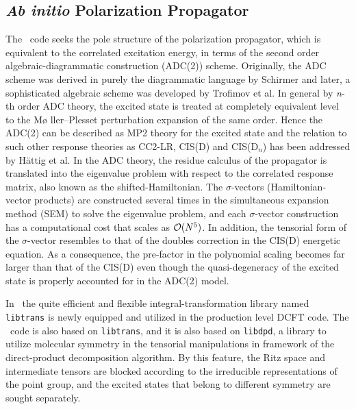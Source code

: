 \subsection{\textit{Ab initio} Polarization Propagator} \label{sec:adc}
\renewcommand{\optionname}[2]{\texttt{\nameref{op-#2-#1}}}

The \PSIadc\ code seeks the pole structure of the polarization
propagator, which is equivalent to the correlated excitation energy,
in terms of the second order algebraic-diagrammatic construction
(ADC(2)) scheme.  Originally, the ADC scheme was derived in purely
the diagrammatic language by Schirmer \cite{Schirmer:1982} and later,
a sophisticated algebraic scheme was developed \cite{Trofimov:2006}
by Trofimov et al. In general by \textit{n}-th order ADC theory, the
excited state is treated at completely equivalent level to the M\o
ller--Plesset perturbation expansion of the same order. Hence the ADC(2)
can be described as MP2 theory for the excited state and the relation
to such other response theories as CC2-LR, CIS(D) and CIS(D${}_n$) has
been addressed \cite{Haettig:2002} by H\"attig et al.  In the ADC theory,
the residue calculus of the propagator is translated into the eigenvalue
problem with respect to the correlated response matrix, also known as the
shifted-Hamiltonian. The $\sigma$-vectors (Hamiltonian-vector products)
are constructed several times in the simultaneous expansion method (SEM)
to solve the eigenvalue problem, and each $\sigma$-vector construction
has a computational cost that scales as ${\cal{O}}(N^5)$. In addition,
the tensorial form of the $\sigma$-vector resembles to that of the
doubles correction in the CIS(D) energetic equation. As a consequence,
the pre-factor in the polynomial scaling becomes far larger than that
of the CIS(D) even though the quasi-degeneracy of the excited state is
properly accounted for in the ADC(2) model.

In \PSIfour\ the quite efficient and flexible integral-transformation
library named {\tt libtrans} is newly equipped and utilized in the
production level DCFT code. The \PSIadc\ code is also based on
{\tt libtrans}, and it is also based on {\tt libdpd}, a library to
utilize molecular symmetry in the tensorial manipulations in framework
of the direct-product decomposition algorithm. By this feature, the Ritz
space and intermediate tensors are blocked according to the irreducible
representations of the point group, and the excited states that belong
to different symmetry are sought separately.

